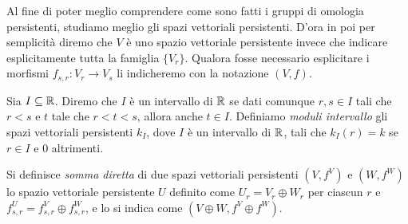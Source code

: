 Al fine di poter meglio comprendere come sono fatti i gruppi di omologia persistenti, studiamo meglio gli spazi vettoriali persistenti. D'ora in poi per semplicità diremo che $V$ è uno spazio vettoriale persistente invece che indicare esplicitamente tutta la famiglia $\{V_r\}$. Qualora fosse necessario esplicitare i morfismi $f_{s,r}:V_r\to V_s$ li indicheremo con la notazione $(V,f)$.

\begin{defn}
  Sia $I\subseteq \mathbb{R}$. Diremo che $I$ è un intervallo di $\mathbb{R}$ se dati comunque $r,s\in I$ tali che $r<s$ e $t$ tale che $r<t<s$, allora anche $t\in I$. Definiamo \emph{moduli intervallo} gli spazi vettoriali persistenti $k_I$, dove $I$ è un intervallo di $\mathbb{R}$, tali che $k_I(r) = k$ se $r\in I$ e $0$ altrimenti.
\end{defn}

\begin{defn}
  Si definisce \emph{somma diretta} di due spazi vettoriali persistenti $(V,f^V)$ e $(W,f^W)$ lo spazio vettoriale persistente $U$ definito come $U_r = V_r\oplus W_r$ per ciascun $r$ e $f^U_{s,r} = f^V_{s,r}\oplus f^W_{s,r}$, e lo si indica come $(V\oplus W,f^V\oplus f^W)$.
\end{defn}

